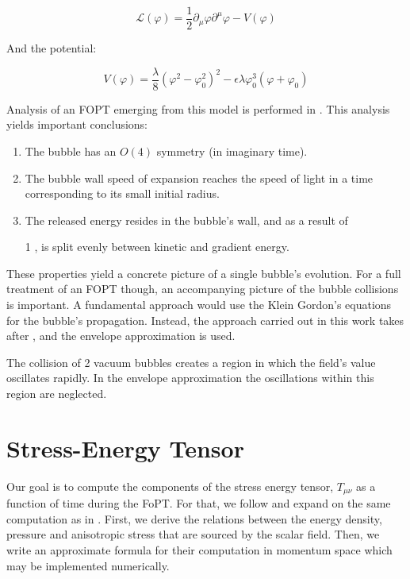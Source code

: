 \documentclass{article}
\begin{document}
\begin{equation} \label{scalar_field_lagrangian}
    \mathcal{L}(\varphi) = \frac{1}{2}\partial_\mu\varphi\partial^\mu\varphi - V(\varphi)
\end{equation}

And the potential:

\begin{equation} \label{FOPT_potential}
    V(\varphi) = \frac{\lambda}{8}(\varphi ^2 - \varphi_0 ^2) ^ 2 - \epsilon\lambda\varphi_0^3(\varphi + \varphi_0)
\end{equation}



Analysis of an FOPT emerging from this model is performed in \cite{coleman}. This analysis yields important conclusions:
\begin{enumerate}
    \item The bubble has an $O(4)$ symmetry (in imaginary time).
    \item  The bubble wall speed of expansion reaches the speed of light in a time corresponding to its small initial radius.
    \item The released energy resides in the bubble's wall, and as a result of \item[1], is split evenly between kinetic and gradient energy.
\end{enumerate}
These properties yield a concrete picture of a single bubble's evolution. For a full treatment of an FOPT though, an accompanying picture of the bubble collisions is important. A fundamental approach would use the Klein Gordon's equations for the bubble's propagation. Instead, the approach carried out in this work takes after \cite{kosowsky}, and the envelope approximation is used. 

The collision of 2 vacuum bubbles creates a region in which the field's value oscillates rapidly. In the envelope approximation the oscillations within this region are neglected.

\section{Stress-Energy Tensor}
Our goal is to compute the components of the stress energy tensor, $T_{\mu\nu}$
as a function of time during the FoPT. For that, we follow and expand on the 
same computation as in \cite{kosowsky_envelope_approximation}.
First, we derive the relations between the energy density, pressure and anisotropic stress
that are sourced by the scalar field. Then, we write an approximate formula for their computation in momentum space
which may be implemented numerically.
\end{document}
